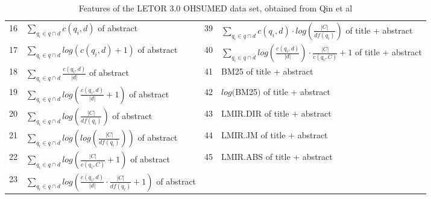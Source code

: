 \begin{table}[!htp]
{\begin{tabular}{p{0.29cm}|p{6.88cm}||p{0.29cm}|p{6cm}}
16& $\sum\nolimits_{q_i \in q \cap d}c(q_i, d)$ of abstract		& 39& $\sum\nolimits_{q_i \in q \cap d}c(q_i,d)\cdot log(\frac{|C|}{df(q_i)})$ of title + abstract\\
17& $\sum\nolimits_{q_i \in q \cap d}log(c(q_i, d)+1)$ of abstract		& 40& $\sum\nolimits_{q_i \in q \cap d} log(\frac{c(q_i,d)}{|d|}) \cdot \frac{|C|}{c(q_i,C)}+1$ of title + abstract\\
18& $\sum\nolimits_{q_i \in q \cap d}\frac{c(q_i,d)}{|d|}$ of abstract		& 41& BM25 of title + abstract\\
19& $\sum\nolimits_{q_i \in q \cap d}log(\frac{c(q_i,d)}{|d|}+1)$ of abstract		& 42& $log($BM25$)$ of title + abstract\\
20& $\sum\nolimits_{q_i \in q \cap d}log(\frac{|C|}{df(q_i)})$ of abstract	& 43& LMIR.DIR of title + abstract\\

21& $\sum\nolimits_{q_i \in q \cap d}log(log(\frac{|C|}{df(q_i)}))$ of abstract					& 44& LMIR.JM of title + abstract\\
22&  $\sum\nolimits_{q_i \in q \cap d}log(\frac{|C|}{c(q_i,C)}+1)$ of abstract					& 45& LMIR.ABS of title + abstract\\
23& $\sum\nolimits_{q_i \in q \cap d}log(\frac{c(q_i,d)}{|d|} \cdot \frac{|C|}{df(q_i)}+1)$ of abstract					& & \\
\end{tabular}
}
\caption{Features of the LETOR 3.0 OHSUMED data set, obtained from Qin et al \cite{Qin2010}}
\label{tbl:features_ohsumed}
\end{table}

